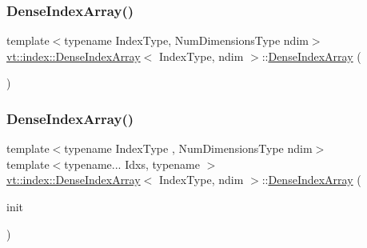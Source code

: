 \subsubsection{\texorpdfstring{Dense\+Index\+Array()}{DenseIndexArray()}\hspace{0.1cm}{\footnotesize\ttfamily [3/6]}}
{\footnotesize\ttfamily template$<$typename Index\+Type, Num\+Dimensions\+Type ndim$>$ \\
\hyperlink{structvt_1_1index_1_1_dense_index_array}{vt\+::index\+::\+Dense\+Index\+Array}$<$ Index\+Type, ndim $>$\+::\hyperlink{structvt_1_1index_1_1_dense_index_array}{Dense\+Index\+Array} (\begin{DoxyParamCaption}\item[{\hyperlink{structvt_1_1index_1_1_dense_index_array}{Dense\+Index\+Array}$<$ Index\+Type, ndim $>$ \&\&}]{ }\end{DoxyParamCaption})\hspace{0.3cm}{\ttfamily [default]}}

\mbox{\label{structvt_1_1index_1_1_dense_index_array_aa866f038df37f085bc6a48a57bcdaaa3}} 
\subsubsection{\texorpdfstring{Dense\+Index\+Array()}{DenseIndexArray()}\hspace{0.1cm}{\footnotesize\ttfamily [4/6]}}
{\footnotesize\ttfamily template$<$typename Index\+Type , Num\+Dimensions\+Type ndim$>$ \\
template$<$typename... Idxs, typename $>$ \\
\hyperlink{structvt_1_1index_1_1_dense_index_array}{vt\+::index\+::\+Dense\+Index\+Array}$<$ Index\+Type, ndim $>$\+::\hyperlink{structvt_1_1index_1_1_dense_index_array}{Dense\+Index\+Array} (\begin{DoxyParamCaption}\item[{Idxs \&\&...}]{init }\end{DoxyParamCaption})\hspace{0.3cm}{\ttfamily [explicit]}}

\mbox{\label{structvt_1_1index_1_1_dense_index_array_a2d67c042ae2ac46fb32063ac63c994e8}} 
